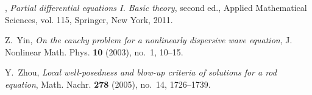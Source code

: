 \documentclass[12pt,oneside,reqno]{amsbook}
\numberwithin{equation}{section}
\begin{document}
\begin{thebibliography}{100}
\bysame, \emph{Partial differential equations {I}. {B}asic theory}, second ed.,
  Applied Mathematical Sciences, vol. 115, Springer, New York, 2011.
  

Z.~Yin, \emph{On the cauchy problem for a nonlinearly dispersive wave
  equation}, J. Nonlinear Math. Phys. \textbf{10} (2003), no.~1, 10--15.

Y.~Zhou, \emph{Local well-posedness and blow-up criteria of solutions for a rod
  equation}, Math. Nachr. \textbf{278} (2005), no.~14, 1726--1739.

\end{thebibliography}
% 
%
\end{document}
